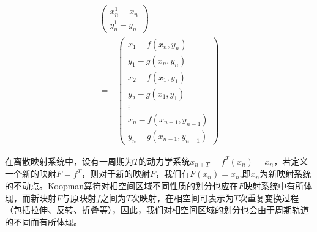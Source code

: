 \begin{equation}
\begin{aligned}
\begin{pmatrix}
            x_{n}^{1}-x_{n}\\
            y_{n}^{1}-y_{n}
        \end{pmatrix}\\ =-
        \begin{pmatrix}
            x_{1}-f(x_{n},y_{n})\\y_{1}-g(x_{n},y_{n})\\
            x_{2}-f(x_{1},y_{1})\\y_{2}-g(x_{1},y_{1})\\
            \vdots\\
            x_{n}-f(x_{n-1},y_{n-1})\\y_{n}-g(x_{n-1},y_{n-1})
        \end{pmatrix}
    \end{aligned}
\end{equation}

在离散映射系统中，设有一周期为$T$的动力学系统$x_{n+T}=f^T(x_n)=x_n$，若定义一个新的映射$F=f^T$，则对于新的映射$F$，我们有$F(x_n)=x_n$,即$x_n$为新映射系统的不动点。Koopman算符对相空间区域不同性质的划分也应在$F$映射系统中有所体现，而新映射$F$与原映射$f$之间为$T$次映射，在相空间可表示为$T$次重复变换过程（包括拉伸、反转、折叠等），因此，我们对相空间区域的划分也会由于周期轨道的不同而有所体现。

% 
% 

